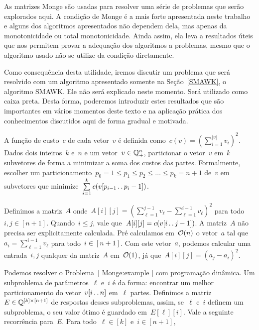 As matrizes Monge são usadas para resolver uma série de problemas que serão explorados aqui. A condição de Monge é a mais forte apresentada neste trabalho e alguns dos algoritmos apresentados não dependem dela, mas apenas da monotonicidade ou total monotonicidade. Ainda assim, ela leva a resultados úteis que nos permitem provar a adequação dos algoritmos a problemas, mesmo que o algoritmo usado não se utilize da condição diretamente.  

Como consequência desta utilidade, iremos discutir um problema que será resolvido com um algoritmo apresentado somente na Seção~\ref{SMAWK}, o algoritmo SMAWK. Ele não será explicado neste momento. Será utilizado como caixa preta. Desta forma, poderemos introduzir estes resultados que são importantes em vários momentos deste texto e na aplicação prática dos conhecimentos discutidos aqui de forma gradual e motivada.   

\begin{prob} \label{ Monge:example }
A função de custo~$c$ de cada vetor~$v$ é definida como~$c(v) = \left( \sum\limits_{i=1}^{|v|} v_i \right)^2$. Dados dois inteiros~$k$ e~$n$ e um vetor~${ v \in \mathbb{Q}^n_+ }$, particionar o vetor~$v$ em~$k$ subvetores de forma a minimizar a soma dos custos das partes. Formalmente, escolher um particionamento~${ p_0 = 1 \leq p_1 \leq p_2 \leq \dots \leq p_k = n+1 }$ de~$v$ em subvetores que minimize~$\sum\limits_{i=1}^k c(v[p_{i-1} \,.\,.\, p_i - 1])$.
\end{prob}

Definimos a matriz~$A$ onde~${ A[i][j] = \left(\sum\limits_{\ell=1}^{j-1} v_\ell - \sum\limits_{\ell=1}^{i-1} v_\ell \right)^2 }$ para todo~${ i,j \in [n+1] }$. Quando~${ i \leq j }$, vale que~${ A[i][j] = c(v[i \,.\,.\, j-1]) }$. A matriz~$A$ não precisa ser explicitamente calculada. Pré calculamos em~$\mathcal{O}(n)$ o vetor~$a$ tal que~${ a_i = \sum_{\ell=1}^{i-1} v_\ell }$ para todo~${ i \in [n+1] }$. Com este vetor~$a$, podemos calcular uma entrada~$i,j$ qualquer da matriz~$A$ em~$\mathcal{O}(1)$, já que~${ A[i][j] = (a_j - a_i)^2 }$.

Podemos resolver o Problema~\ref{ Monge:example } com programação dinâmica. Um subproblema de parâmetros~$\ell$ e~$i$ é da forma: encontrar um melhor particionamento do vetor~${v[i \,.\,.\, n]}$ em~$\ell$ partes. Definimos a matriz~${E \in \mathbb{Q}^{[k] \times [n+1]}}$ de respostas desses subproblemas, assim, se~$\ell$ e~$i$ definem um subproblema, o seu valor ótimo é guardado em~$E[\ell][i]$. Vale a seguinte recorrência para~$E$. Para todo~$\ell \in [k]$ e~$i \in [n+1]$,

